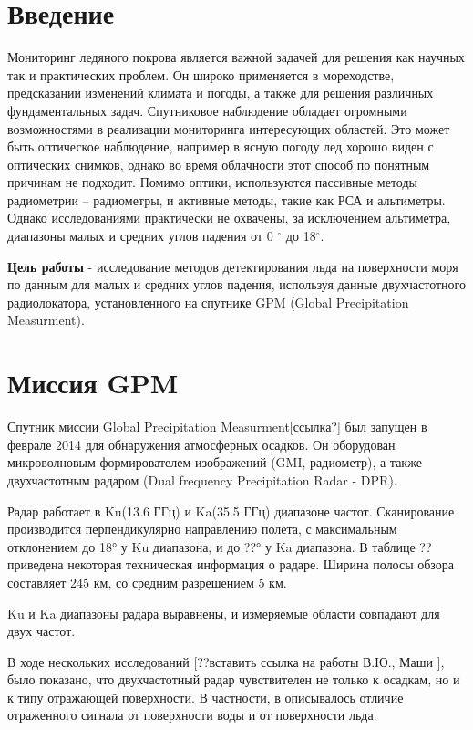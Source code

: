 





\tableofcontents
\newpage
\section{Введение}

Мониторинг ледяного покрова является важной задачей для решения как научных так и практических проблем. Он широко
применяется в мореходстве, предсказании изменений климата и погоды, а также для решения различных фундаментальных задач.
Спутниковое наблюдение обладает огромными возможностями в реализации мониторинга интересующих областей.
Это может быть оптическое наблюдение, например в ясную погоду лед хорошо виден с оптических снимков, однако во время
облачности этот способ по понятным причинам не подходит. Помимо оптики, используются пассивные методы радиометрии –
радиометры, и активные методы, такие как РСА и альтиметры. Однако исследованиями практически не охвачены, за исключением
альтиметра, диапазоны малых и средних углов падения от 0 $^{\circ}$ до 18$^{\circ}$.

\textbf{Цель работы} - исследование методов детектирования льда на поверхности моря по данным для малых и средних углов падения,
используя данные двухчастотного радиолокатора, установленного на спутнике GPM (Global Precipitation Measurment).


\section{Миссия GPM}
Спутник миссии Global Precipitation Measurment[ссылка?] был запущен в феврале 2014 для обнаружения атмосферных осадков.
Он оборудован микроволновым формирователем изображений (GMI, радиометр), а также двухчастотным радаром (Dual frequency
Precipitation Radar - DPR). 

Радар работает в Ku(13.6 ГГц) и Ka(35.5 ГГц) диапазоне частот. Сканирование производится перпендикулярно направлению
полета, с максимальным отклонением до 18° у Ku диапазона, и до ??° у Ka диапазона. В таблице ?? приведена некоторая
техническая информация о радаре.
Ширина полосы обзора составляет 245 км, со средним разрешением 5 км.

Ku и Ka диапазоны радара выравнены, и измеряемые области совпадают для двух частот.  

В ходе нескольких исследований [??вставить ссылка на работы В.Ю., Маши ], было показано, что двухчастотный радар
чувствителен не только к осадкам, но и к типу отражающей поверхности. В частности, в \cite{kar1} описывалось отличие
отраженного сигнала от поверхности воды и от поверхности льда.


